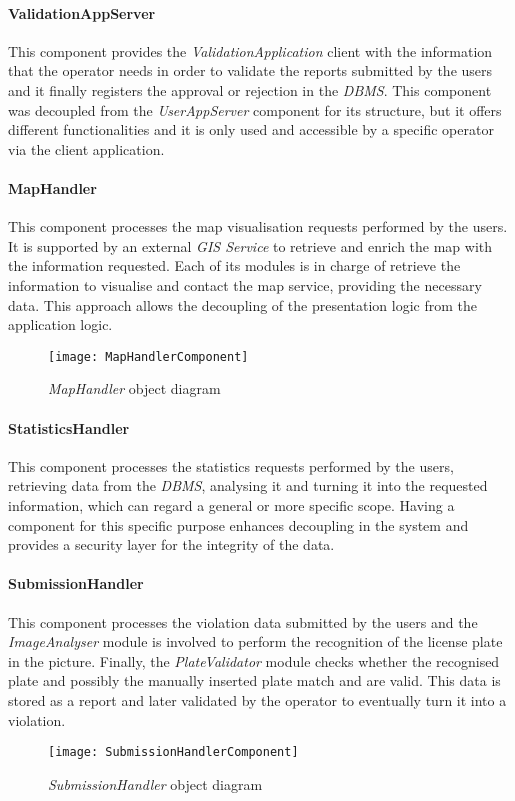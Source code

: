 \paragraph{ValidationAppServer}
This component provides the \textit{ValidationApplication} client with the information that the operator needs in order to validate the reports submitted by the users and it finally registers the approval or rejection in the \textit{DBMS}. This component was decoupled from the \textit{UserAppServer} component for its structure, but it offers different functionalities and it is only used and accessible by a specific operator via the client application.
\paragraph{MapHandler}
This component processes the map visualisation requests performed by the users. It is supported by an external \textit{GIS Service} to retrieve and enrich the map with the information requested. Each of its modules is in charge of retrieve the information to visualise and contact the map service, providing the necessary data. This approach allows the decoupling of the presentation logic from the application logic.\newline\newline
\begin{figure}[h!]
	\centering
	\texttt{[image: MapHandlerComponent]}
	\caption{
		\label{fig:mapHandlerComponentDiagram} 
		\emph{MapHandler} object diagram
	}
\end{figure}
\paragraph{StatisticsHandler}
This component processes the statistics requests performed by the users, retrieving data from the \textit{DBMS}, analysing it and turning it into the requested information, which can regard a general or more specific scope. Having a component for this specific purpose enhances decoupling in the system and provides a security layer for the integrity of the data.
\paragraph{SubmissionHandler}
This component processes the violation data submitted by the users and the \textit{ImageAnalyser} module is involved to perform the recognition of the license plate in the picture. Finally, the \textit{PlateValidator} module checks whether the recognised plate and possibly the manually inserted plate match and are valid. This data is stored as a report and later validated by the operator to eventually turn it into a violation.\newline\newline
\begin{figure}[h!]
	\centering
	\texttt{[image: SubmissionHandlerComponent]}
	\caption{
		\label{fig:submissionHandlerComponentDiagram} 
		\emph{SubmissionHandler} object diagram
	}
\end{figure}
